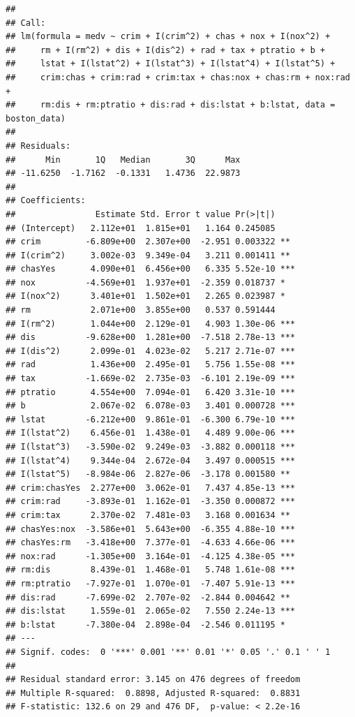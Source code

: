 \documentclass[
]{article}
\begin{document}
\begin{verbatim}
## 
## Call:
## lm(formula = medv ~ crim + I(crim^2) + chas + nox + I(nox^2) + 
##     rm + I(rm^2) + dis + I(dis^2) + rad + tax + ptratio + b + 
##     lstat + I(lstat^2) + I(lstat^3) + I(lstat^4) + I(lstat^5) + 
##     crim:chas + crim:rad + crim:tax + chas:nox + chas:rm + nox:rad + 
##     rm:dis + rm:ptratio + dis:rad + dis:lstat + b:lstat, data = boston_data)
## 
## Residuals:
##      Min       1Q   Median       3Q      Max 
## -11.6250  -1.7162  -0.1331   1.4736  22.9873 
## 
## Coefficients:
##                Estimate Std. Error t value Pr(>|t|)    
## (Intercept)   2.112e+01  1.815e+01   1.164 0.245085    
## crim         -6.809e+00  2.307e+00  -2.951 0.003322 ** 
## I(crim^2)     3.002e-03  9.349e-04   3.211 0.001411 ** 
## chasYes       4.090e+01  6.456e+00   6.335 5.52e-10 ***
## nox          -4.569e+01  1.937e+01  -2.359 0.018737 *  
## I(nox^2)      3.401e+01  1.502e+01   2.265 0.023987 *  
## rm            2.071e+00  3.855e+00   0.537 0.591444    
## I(rm^2)       1.044e+00  2.129e-01   4.903 1.30e-06 ***
## dis          -9.628e+00  1.281e+00  -7.518 2.78e-13 ***
## I(dis^2)      2.099e-01  4.023e-02   5.217 2.71e-07 ***
## rad           1.436e+00  2.495e-01   5.756 1.55e-08 ***
## tax          -1.669e-02  2.735e-03  -6.101 2.19e-09 ***
## ptratio       4.554e+00  7.094e-01   6.420 3.31e-10 ***
## b             2.067e-02  6.078e-03   3.401 0.000728 ***
## lstat        -6.212e+00  9.861e-01  -6.300 6.79e-10 ***
## I(lstat^2)    6.456e-01  1.438e-01   4.489 9.00e-06 ***
## I(lstat^3)   -3.590e-02  9.249e-03  -3.882 0.000118 ***
## I(lstat^4)    9.344e-04  2.672e-04   3.497 0.000515 ***
## I(lstat^5)   -8.984e-06  2.827e-06  -3.178 0.001580 ** 
## crim:chasYes  2.277e+00  3.062e-01   7.437 4.85e-13 ***
## crim:rad     -3.893e-01  1.162e-01  -3.350 0.000872 ***
## crim:tax      2.370e-02  7.481e-03   3.168 0.001634 ** 
## chasYes:nox  -3.586e+01  5.643e+00  -6.355 4.88e-10 ***
## chasYes:rm   -3.418e+00  7.377e-01  -4.633 4.66e-06 ***
## nox:rad      -1.305e+00  3.164e-01  -4.125 4.38e-05 ***
## rm:dis        8.439e-01  1.468e-01   5.748 1.61e-08 ***
## rm:ptratio   -7.927e-01  1.070e-01  -7.407 5.91e-13 ***
## dis:rad      -7.699e-02  2.707e-02  -2.844 0.004642 ** 
## dis:lstat     1.559e-01  2.065e-02   7.550 2.24e-13 ***
## b:lstat      -7.380e-04  2.898e-04  -2.546 0.011195 *  
## ---
## Signif. codes:  0 '***' 0.001 '**' 0.01 '*' 0.05 '.' 0.1 ' ' 1
## 
## Residual standard error: 3.145 on 476 degrees of freedom
## Multiple R-squared:  0.8898, Adjusted R-squared:  0.8831 
## F-statistic: 132.6 on 29 and 476 DF,  p-value: < 2.2e-16
\end{verbatim}
\end{document}
